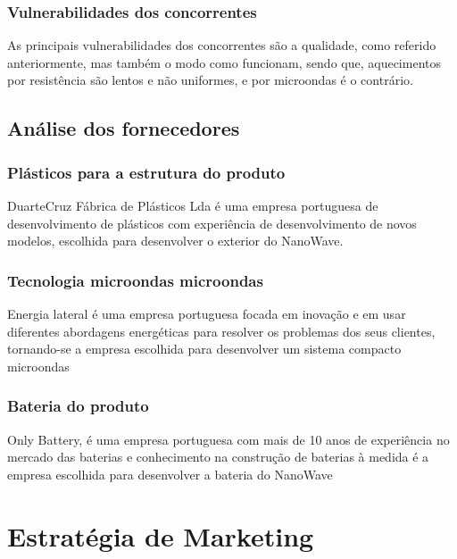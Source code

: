 \documentclass[a4paper]{article}
\begin{document}
\subsubsection{Vulnerabilidades dos concorrentes}
As principais vulnerabilidades dos concorrentes são a qualidade, como referido anteriormente, mas também o modo como funcionam, sendo que, aquecimentos por resistência são lentos e não uniformes, e por microondas é o contrário.

\subsection{Análise dos fornecedores}
\subsubsection{Plásticos para a estrutura do produto}
DuarteCruz Fábrica de Plásticos Lda é uma empresa portuguesa de desenvolvimento de plásticos com experiência de desenvolvimento de novos modelos, escolhida para desenvolver o exterior do NanoWave.
\subsubsection{Tecnologia microondas microondas}
Energia lateral é uma empresa portuguesa focada em inovação e em usar diferentes abordagens energéticas para resolver os problemas dos seus clientes, tornando-se a empresa escolhida para desenvolver um sistema compacto microondas
\subsubsection{Bateria do produto}
Only Battery, é uma empresa portuguesa com mais de 10 anos de experiência no mercado das baterias e conhecimento na construção de baterias à medida é a empresa escolhida para desenvolver a bateria do NanoWave

\section{Estratégia de Marketing}
\end{document}
